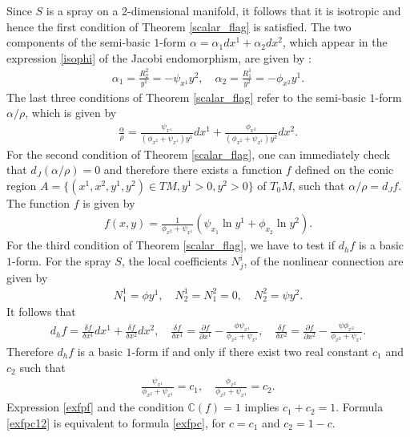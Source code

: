 \documentclass[oneside,english]{amsart}
\numberwithin{equation}{section}
\numberwithin{figure}{section}
\theoremstyle{plain}
\theoremstyle{plain}
\theoremstyle{definition}
\theoremstyle{plain}
\theoremstyle{plain}
\theoremstyle{plain}
\theoremstyle{remark}
\theoremstyle{remark}
\begin{document}
Since $S$ is a spray on a $2$-dimensional manifold, it follows that it is isotropic and hence the first condition of Theorem
\ref{scalar_flag} is satisfied. The two components of the semi-basic
$1$-form $\alpha=\alpha_1dx^1+\alpha_2 dx^2$, which appear in the expression \eqref{isophi} of
the Jacobi endomorphism, are given by \cite[(4.4)]{BM13}:
\begin{eqnarray*}
  \alpha_1=\frac{R^2_2}{y^1}=-\psi_{x^1} y^2, \quad
  \alpha_2=\frac{R^1_1}{y^2}=-\phi_{x^2} y^1. \end{eqnarray*} 
The last three conditions of Theorem \ref{scalar_flag}  refer to the
semi-basic $1$-form $\alpha/\rho$, which is given by
\begin{eqnarray*}
  \frac{\alpha}{\rho} = \frac{\psi_{x^1}}{(\phi_{x^2} +
    \psi_{x^1})y^1}dx^1 + \frac{\phi_{x^2}}{(\phi_{x^2} +
    \psi_{x^1})y^2}dx^2. \label{exfpar} \end{eqnarray*}
For the second condition of Theorem \ref{scalar_flag}, one can
immediately check that $d_J(\alpha/\rho)=0$ and therefore there exists
a function $f$ defined on the conic region $A=\{(x^1,x^2, y^1, y^2)\in
TM, y^1>0, y^2>0\}$ of $T_0M$, such that $\alpha/\rho=d_Jf$. The function $f$ is given by 
\begin{eqnarray}
  f(x,y)=\frac{1}{\phi_{x^2} + \psi_{x^1}}\left( \psi_{x_1}\ln y^1 +
    \phi_{x_2}\ln y^2\right). \label{exfpf} \end{eqnarray}  
For the third condition of Theorem \ref{scalar_flag}, we have to test
if $d_hf$ is a basic $1$-form. For the spray $S$, the local
coefficients $N^i_j$, of the nonlinear connection are given by 
\begin{eqnarray*} N^1_1=\phi y^1, \quad N^1_2=N^2_1=0, \quad
  N^2_2=\psi y^2. \end{eqnarray*} It follows that 
\begin{eqnarray*} 
  d_hf  =  \frac{\delta f}{\delta x^1}dx^1 + \frac{\delta f}{\delta
    x^2}dx^2, \quad 
  \frac{\delta f}{\delta x^1}  =  \frac{\partial f}{\partial x^1} -
  \frac{\phi \psi_{x^1}}{\phi_{x^2} +
    \psi_{x^1}}, \quad \frac{\delta f}{\delta x^2}  =  \frac{\partial f}{\partial x^2} -
  \frac{\psi \phi_{x^2}}{\phi_{x^2} + \psi_{x^1}}.   \end{eqnarray*} 
Therefore $d_hf$ is a basic $1$-form if and only if there exist two
real constant $c_1$ and $c_2$ such that 
\begin{eqnarray}
  \frac{\psi_{x^1}}{\phi_{x^2} + \psi_{x^1}} = c_1, \quad  \frac{\phi_{x^2}}{\phi_{x^2} +
    \psi_{x^1}}=c_2. \label{exfpc12} \end{eqnarray} Expression \eqref{exfpf} and the
condition $\mathbb{C}(f)=1$ implies $c_1+c_2=1$. Formula
\eqref{exfpc12} is equivalent to formula \eqref{exfpc}, for $c=c_1$
and $c_2=1-c$. 
\end{document}
